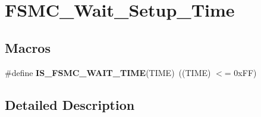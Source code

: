 \hypertarget{group___f_s_m_c___wait___setup___time}{\section{F\-S\-M\-C\-\_\-\-Wait\-\_\-\-Setup\-\_\-\-Time}
\label{group___f_s_m_c___wait___setup___time}
}
\subsection*{Macros}
\begin{DoxyCompactItemize}
\item 
\hypertarget{group___f_s_m_c___wait___setup___time_ga5c0efc48afb916ceff32868940f81613}{\#define {\bfseries I\-S\-\_\-\-F\-S\-M\-C\-\_\-\-W\-A\-I\-T\-\_\-\-T\-I\-M\-E}(T\-I\-M\-E)~((T\-I\-M\-E) $<$= 0x\-F\-F)}\label{group___f_s_m_c___wait___setup___time_ga5c0efc48afb916ceff32868940f81613}

\end{DoxyCompactItemize}


\subsection{Detailed Description}
